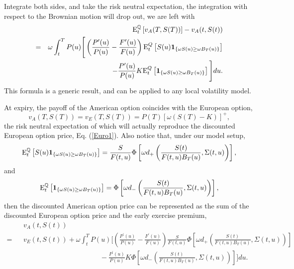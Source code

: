 \documentclass[12pt]{article}
\begin{document}
    Integrate both sides, and take the risk neutral expectation, the integration with respect to the Brownian motion
    will drop out, we are left with
    \begin{eqnarray}
      &&{\rm E}_t^{\mathbb{Q}}\left[v_A(T,S(T))\right]-v_A(t,S(t)) \nonumber\\
      = &&\omega\int_t^T P(u)\Bigg[\left(\frac{P^{\prime}(u)}{P(u)}-\frac{F^{\prime}(u)}{F(u)}\right)
                          {\rm E}_t^Q\left[S(u)\mathbf{1}_{\{\omega S(u)\geq\omega B_T(u)\}}\right]\nonumber\\
        &&\quad\quad\quad\quad\quad\quad\quad- \frac{P^{\prime}(u)}{P(u)} K
                          {\rm E}_t^Q\left[\mathbf{1}_{\{\omega S(u)\geq\omega B_T(u)\}}\right] \Bigg]du.
    \end{eqnarray}
    This formula is a generic result, and can be applied to any local volatility model.

    At expiry, the payoff of the American option coincides with the European option,
    \begin{equation}
      v_A(T,S(T)) = v_E(T,S(T))=P(T)\left[\omega\left(S(T)-K\right)\right]^+,
    \end{equation}
    the risk neutral expectation of which will actually reproduce the discounted European option price, Eq. (\ref{Euro1}).
    Also notice that, under our model setup,
    \begin{equation}
      {\rm E}_t^{\mathbb{Q}}\left[S(u)\mathbf{1}_{\{\omega S(u)\geq\omega B_T(u)\}}\right]
       = \frac{S}{F(t,u)}\Phi\left[\omega d_+\left(\frac{S(t)}{F(t,u)B_T(u)}, \Sigma(t,u)\right)\right],
    \end{equation}
    and
    \begin{equation}
      {\rm E}_t^{\mathbb{Q}}\left[\mathbf{1}_{\{\omega S(u)\geq\omega B_T(u)\}}\right]
       = \Phi\left[\omega d_-\left(\frac{S(t)}{F(t,u)B_T(u)}, \Sigma(t,u)\right)\right],
    \end{equation}
    then the discounted American option price can be represented as the sum of the discounted European
    option price and the early exercise premium,
    \begin{eqnarray}
      \label{EEP}
      &&v_A(t,S(t))\nonumber\\
      =&&v_E(t,S(t))+\omega\int_t^TP(u)\Bigg[\left(\frac{P^{\prime}(u)}{P(u)}-\frac{F^{\prime}(u)}{F(u)}\right)
      \frac{S}{F(t,u)}\Phi\left[\omega d_+\left(\frac{S(t)}{F(t,u)B_T(u)}, \Sigma(t,u)\right)\right]\nonumber\\
      &&\quad\quad\quad\quad\quad\quad\quad\quad\quad\quad\quad - \frac{P^{\prime}(u)}{P(u)} K
      \Phi\left[\omega d_-\left(\frac{S(t)}{F(t,u)B_T(u)}, \Sigma(t,u)\right)\right] \Bigg]du.
    \end{eqnarray}
\end{document}
